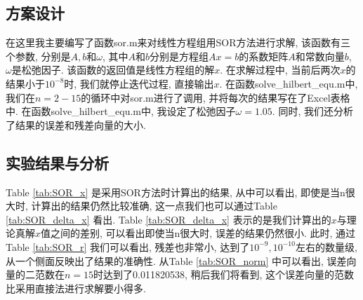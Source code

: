 \documentclass[a4paper]{article}
\begin{document}
\begin{CJK*}{GBK}{song}
\subsection{方案设计}
在这里我主要编写了函数sor.m来对线性方程组用SOR方法进行求解, 该函数有三个参数, 分别是$A,b$和$\omega$, 其中$A$和$b$分别是方程组$Ax=b$的系数矩阵$A$和常数向量$b$, $\omega$是松弛因子. 该函数的返回值是线性方程组的解$x$. 在求解过程中, 当前后两次$x$的结果小于$10^{-8}$时, 我们就停止迭代过程, 直接输出$x$. 在函数solve\_hilbert\_equ.m中, 我们在$n=2-15$的循环中对sor.m进行了调用, 并将每次的结果写在了Excel表格中. 在函数solve\_hilbert\_equ.m中, 我设定了松弛因子$\omega=1.05$. 同时, 我们还分析了结果的误差和残差向量的大小.

\subsection{实验结果与分析}
Table \ref{tab:SOR_x} 是采用SOR方法时计算出的结果, 从中可以看出, 即使是当n很大时, 计算出的结果仍然比较准确, 这一点我们也可以通过Table \ref{tab:SOR_delta_x} 看出. Table \ref{tab:SOR_delta_x} 表示的是我们计算出的$x$与理论真解$x$值之间的差别, 可以看出即使当n很大时, 误差的结果仍然很小. 此时, 通过 Table \ref{tab:SOR_r} 我们可以看出, 残差也非常小, 达到了$10^{-9}, 10^{-10}$左右的数量级, 从一个侧面反映出了结果的准确性. 从Table \ref{tab:SOR_norm} 中可以看出, 误差向量的二范数在$n=15$时达到了0.011820538, 稍后我们将看到, 这个误差向量的范数比采用直接法进行求解要小得多.
\begin{center}
\begin{table*}[!htbp]
\end{table*}
\end{center}
\end{CJK*}
\end{document}
